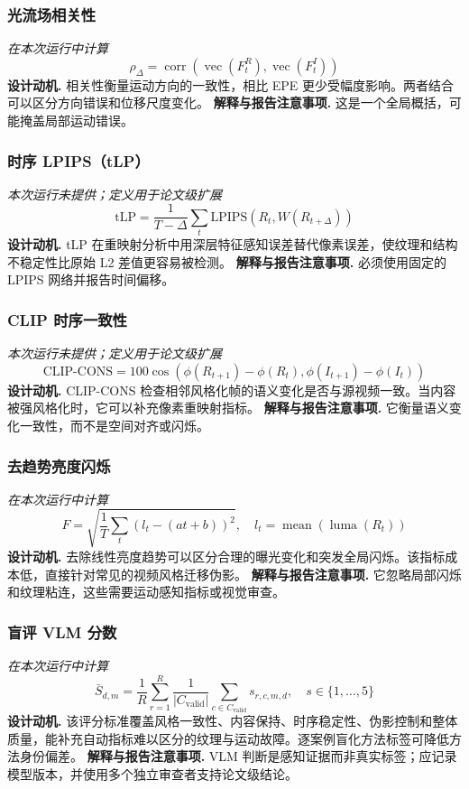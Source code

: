\documentclass[UTF8,10pt]{ctexart}
\begin{document}
\subsubsection*{光流场相关性}
\textit{在本次运行中计算}
\begin{equation*}
\rho_{\Delta}=\operatorname{corr}\!\left(\operatorname{vec}(F^R_t),\operatorname{vec}(F^I_t)\right)
\end{equation*}
\textbf{设计动机.} 相关性衡量运动方向的一致性，相比 EPE 更少受幅度影响。两者结合可以区分方向错误和位移尺度变化。
\textbf{解释与报告注意事项.} 这是一个全局概括，可能掩盖局部运动错误。
\subsubsection*{时序 LPIPS（tLP）}
\textit{本次运行未提供；定义用于论文级扩展}
\begin{equation*}
\mathrm{tLP}=\frac{1}{T-\Delta}\sum_t\mathrm{LPIPS}\!\left(R_t,W(R_{t+\Delta})\right)
\end{equation*}
\textbf{设计动机.} tLP 在重映射分析中用深层特征感知误差替代像素误差，使纹理和结构不稳定性比原始 L2 差值更容易被检测。
\textbf{解释与报告注意事项.} 必须使用固定的 LPIPS 网络并报告时间偏移。
\subsubsection*{CLIP 时序一致性}
\textit{本次运行未提供；定义用于论文级扩展}
\begin{equation*}
\mathrm{CLIP\text{-}CONS}=100\cos\!\left(\phi(R_{t+1})-\phi(R_t),\phi(I_{t+1})-\phi(I_t)\right)
\end{equation*}
\textbf{设计动机.} CLIP-CONS 检查相邻风格化帧的语义变化是否与源视频一致。当内容被强风格化时，它可以补充像素重映射指标。
\textbf{解释与报告注意事项.} 它衡量语义变化一致性，而不是空间对齐或闪烁。
\subsubsection*{去趋势亮度闪烁}
\textit{在本次运行中计算}
\begin{equation*}
F=\sqrt{\frac{1}{T}\sum_t\left(l_t-(at+b)\right)^2},\quad l_t=\operatorname{mean}(\operatorname{luma}(R_t))
\end{equation*}
\textbf{设计动机.} 去除线性亮度趋势可以区分合理的曝光变化和突发全局闪烁。该指标成本低，直接针对常见的视频风格迁移伪影。
\textbf{解释与报告注意事项.} 它忽略局部闪烁和纹理粘连，这些需要运动感知指标或视觉审查。
\subsubsection*{盲评 VLM 分数}
\textit{在本次运行中计算}
\begin{equation*}
\bar S_{d,m}=\frac{1}{R}\sum_{r=1}^{R}\frac{1}{|C_{\mathrm{valid}}|}\sum_{c\in C_{\mathrm{valid}}}s_{r,c,m,d},\quad s\in\{1,\ldots,5\}
\end{equation*}
\textbf{设计动机.} 该评分标准覆盖风格一致性、内容保持、时序稳定性、伪影控制和整体质量，能补充自动指标难以区分的纹理与运动故障。逐案例盲化方法标签可降低方法身份偏差。
\textbf{解释与报告注意事项.} VLM 判断是感知证据而非真实标签；应记录模型版本，并使用多个独立审查者支持论文级结论。
\end{document}
